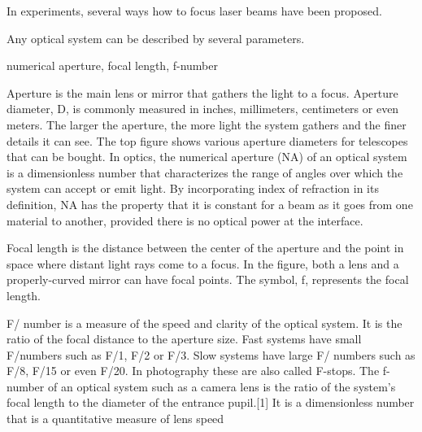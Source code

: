 In experiments, several ways how to focus laser beams have been proposed. 

Any optical system can be described by several parameters.

numerical aperture, focal length, f-number

Aperture is the main lens or mirror that gathers the light to a
focus. Aperture diameter, D, is commonly measured in inches,
millimeters, centimeters or even meters. The larger the aperture, the
more light the system gathers and the finer details it can see. The top
figure shows various aperture diameters for telescopes that can be
bought. In optics, the numerical aperture (NA) of an optical system is a dimensionless number that characterizes the range of angles over which the system can accept or emit light. By incorporating index of refraction in its definition, NA has the property that it is constant for a beam as it goes from one material to another, provided there is no optical power at the interface.

Focal length is the distance between the center of the aperture
and the point in space where distant light rays come to a focus. In the
figure, both a lens and a properly-curved mirror can have focal points.
The symbol, f, represents the focal length.

F/ number is a measure of the speed and clarity of the optical
system. It is the ratio of the focal distance to the aperture size. Fast
systems have small F/numbers such as F/1, F/2 or F/3. Slow systems
have large F/ numbers such as F/8, F/15 or even F/20. In photography
these are also called F-stops. The f-number of an optical system such as a camera lens is the ratio of the system's focal length to the diameter of the entrance pupil.[1] It is a dimensionless number that is a quantitative measure of lens speed



\begin{figure}[h!]
	\centering
	\hspace{5mm}
	\caption{}
	\label{}
\end{figure}